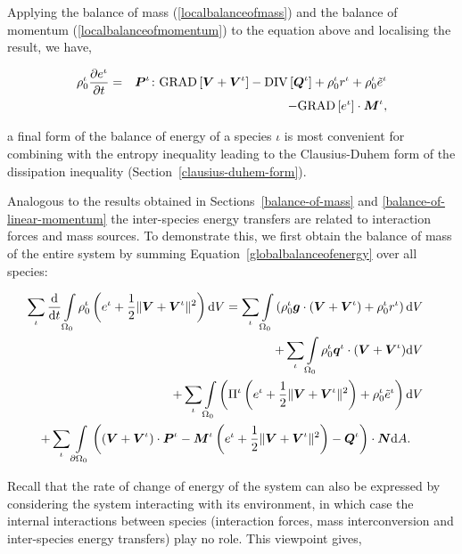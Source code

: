 \noindent Applying the balance of mass (\ref{localbalanceofmass}) and
the balance of momentum (\ref{localbalanceofmomentum}) to the equation
above and localising the result, we have,

\begin{eqnarray}
\rho^\iota_0\frac{\partial e^\iota}{\partial t} &=&
\mbox{\boldmath$ P$}^\iota\colon\mathrm{\small{GRAD}}\left[\mbox{\boldmath$ V$}+\mbox{\boldmath$ V$}^\iota\right]-
\mathrm{\small{DIV}}\left[\mbox{\boldmath$ Q$}^\iota\right] + \rho_0^\iota r^\iota
+\rho^\iota_0\tilde{e}^\iota\nonumber\\
& & - \mathrm{\small{GRAD}}\left[e^\iota\right]\cdot\mbox{\boldmath$ M$}^\iota,
\label{localbalanceofenergy}
\end{eqnarray}

\noindent a final form of the balance of energy of a species $\iota$
is most convenient for combining with the entropy inequality leading
to the Clausius-Duhem form of the dissipation inequality
(Section~\ref{clausius-duhem-form}).

Analogous to the results obtained in Sections~\ref{balance-of-mass}
and \ref{balance-of-linear-momentum} the inter-species energy
transfers are related to interaction forces and mass sources. To
demonstrate this, we first obtain the balance of mass of the entire
system by summing Equation~\ref{globalbalanceofenergy} over all species:

\begin{eqnarray}
\sum\limits_{\iota}\frac{\mathrm{d}}{\mathrm{d}t}
\int\limits_{\Omega_0}\rho_0^\iota \left ( e^\iota + \frac{1}{2}
\Vert\mbox{\boldmath$ V$}+\mbox{\boldmath$ V$}^\iota\Vert^2 \right ) \mathrm{d}V =
\sum\limits_{\iota}\int\limits_{\Omega_0} \left(\rho_0^\iota\mbox{\boldmath$ g$}
\cdot\left(\mbox{\boldmath$ V$}+\mbox{\boldmath$ V$}^\iota\right) + \rho_0^\iota r^\iota
\right)\mathrm{d}V& &\nonumber\\ +
\sum\limits_{\iota}\int\limits_{\Omega_0}
\rho_0^\iota\mbox{\boldmath$ q$}^\iota\cdot(\mbox{\boldmath$ V$}+\mbox{\boldmath$ V$}^\iota)\mathrm{d}V&  
&\nonumber\\
+ \sum\limits_{\iota}\int\limits_{\Omega_0}
\left(\Pi^\iota\left(e^\iota
+ \frac{1}{2}\Vert\mbox{\boldmath$ V$}+\mbox{\boldmath$ V$}^\iota\Vert^2\right) +
\rho^\iota_0\tilde{e}^\iota\right)\mathrm{d}V & &  \\ 
+\sum\limits_{\iota}\int\limits_{\partial
  \Omega_0}\left(\left(\mbox{\boldmath$ V$}+\mbox{\boldmath$ V$}^\iota\right)\cdot\mbox{\boldmath$ P$}^\iota -
\mbox{\boldmath$ M$}^\iota\left(e^\iota +\frac{1}{2}
\Vert\mbox{\boldmath$ V$}+\mbox{\boldmath$ V$}^\iota\Vert^2\right) -
\mbox{\boldmath$ Q$}^\iota\right)\cdot\mbox{\boldmath$ N$}\mathrm{d}A.\quad& & \nonumber
\label{energysummation}
\end{eqnarray}

Recall that the rate of change of energy of the system can also be
expressed by considering the system interacting with its environment,
in which case the internal interactions between species (interaction
forces, mass interconversion and inter-species energy transfers) play
no role. This viewpoint gives,

